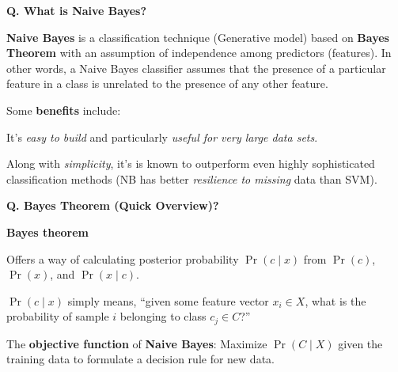 \begin{frame}[fragile]{\textbf{Q. What is Naive Bayes?}}
  \begin{wideitemize}
  \item \textbf{Naive Bayes} is a classification technique (Generative model) based
    on \textbf{Bayes Theorem} with an assumption of independence among predictors (features).
    In other words, a Naive Bayes classifier assumes that the presence of a particular feature in a
    class is unrelated to the presence of any other feature.
  \item Some \textbf{benefits} include:\medskip
  \begin{wideitemize}
    \item It's \textit{easy to build} and particularly \textit{useful for very large data sets}.
    \item Along with \textit{simplicity}, it's is known to outperform even highly
      sophisticated classification methods (NB has better \textit{resilience to missing} data than SVM).
  \end{wideitemize}
  \end{wideitemize}
\end{frame}

\begin{frame}[fragile]{\textbf{Q. Bayes Theorem (Quick Overview)?}}
  \begin{wideitemize}\small
  \item \textbf{Bayes theorem} \medskip
    \begin{wideitemize}\small
      \item Offers a way of calculating posterior probability $\Pr( c \mid x )$ from
      $\Pr( c )$, $\Pr( x )$, and $\Pr( x \mid c )$.
      \item $\Pr( c \mid x )$ simply means, ``given some feature vector $x_i \in X$, what is the
      probability of sample $i$ belonging to class $c_j \in C$?''
  \end{wideitemize}
  \end{wideitemize}

  \begin{framed}
    The \textbf{objective function} of \textbf{Naive Bayes}: Maximize $\Pr( C
    \mid X )$ given the training data to formulate a decision rule for new data.
  \end{framed}

\end{frame}


